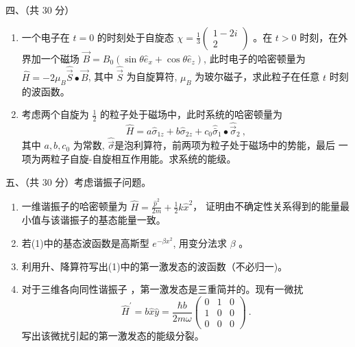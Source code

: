 四、（共 30 分）
\begin{enumerate}
	\item
	一个电子在 $t=0$ 的时刻处于自旋态 $\chi=\frac{1}{3}\left(\begin{array}{c}1-2 i \\ 2\end{array}\right)$ 。在 $t>0$ 时刻，在外界加一个磁场 $\vec{B}=B_{0}\left(\sin \theta \hat{e}_{x}+\cos \theta \hat{e}_{z}\right)$, 此时电子的哈密顿量为 $\hat{H}=-2 \mu_{B} \hat{\vec{S}} \bullet \vec{B}$, 其中 $\hat{\vec{S}}$ 为自旋算符, $\mu_{B}$ 为玻尔磁子，求此粒子在任意 $t$ 时刻的波函数。
	\item 
	考虑两个自旋为 $\frac{1}{2}$ 的粒子处于磁场中，此时系统的哈密顿量为
	\[ \hat{H}=a \hat{\sigma}_{1 z}+b \hat{\sigma}_{2 z}+c_{0} \hat{\bar{\sigma}}_{1} \bullet \hat{\vec{\sigma}}_{2} ~, \]
	其中 $a, b, c_{0}$ 为常数, $\hat{\vec{\sigma}}$是泡利算符，前两项为粒子处于磁场中的势能，最后
	一项为两粒子自旋-自旋相互作用能。求系统的能级。
\end{enumerate}

五、（共 30 分）考虑谐振子问题。
\begin{enumerate}
	\item
	一维谐振子的哈密顿量为 $\hat{H}=\frac{\hat{p}^{2}}{2 m}+\frac{1}{2} k \hat{x}^{2}$，
	证明由不确定性关系得到的能量最小值与该谐振子的基态能量一致。
	\item 
	若(1)中的基态波函数是高斯型 $e^{-\beta x^{2}}$, 用变分法求 $\beta$ 。
	\item 
	利用升、降算符写出(1)中的第一激发态的波函数（不必归一)。
	\item 
	对于三维各向同性谐振子 ，第一激发态是三重简并的。现有一微扰
	\[ 
	\hat{H}^{\prime}=b \hat{x} \hat{y}=\frac{\hbar b}{2 m \omega}\left(\begin{array}{ccc}0 & 1 & 0 \\ 1 & 0 & 0 \\ 0 & 0 & 0\end{array}\right) ~.
	 \]
	写出该微扰引起的第一激发态的能级分裂。
\end{enumerate}
